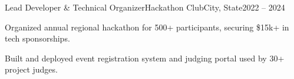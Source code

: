 \begin{cventry}{Lead Developer \& Technical Organizer}{Hackathon Club}{City, State}{2022 -- 2024}
    \item Organized annual regional hackathon for 500+ participants, securing \$15k+ in tech sponsorships.
    \item Built and deployed event registration system and judging portal used by 30+ project judges.
\end{cventry}
